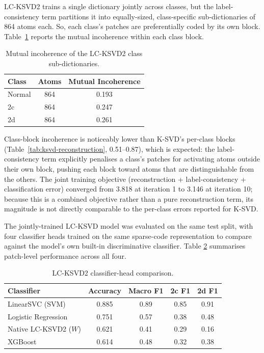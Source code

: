 LC-KSVD2 trains a single dictionary jointly across classes, but the label-consistency
term partitions it into equally-sized, class-specific sub-dictionaries of 864 atoms each. So,
each class's patches are preferentially coded by its own block. Table~\ref{tab:lcksvd2-reconstruction}
reports the mutual incoherence within each class block.

\begin{table}[H]
\centering
\caption{Mutual incoherence of the LC-KSVD2 class sub-dictionaries.}
\label{tab:lcksvd2-reconstruction}
\begin{tabular}{lcc}
\hline
\textbf{Class} & \textbf{Atoms} & \textbf{Mutual Incoherence} \\
\hline
Normal   & 864 & 0.193 \\
2c       & 864 & 0.247 \\
2d       & 864 & 0.261 \\
\hline
\end{tabular}
\end{table}

Class-block incoherence is noticeably lower than K-SVD's per-class blocks
(Table~\ref{tab:ksvd-reconstruction}, 0.51--0.87), which is expected: the label-consistency term
explicitly penalises a class's patches for activating atoms outside their own block, pushing each
block toward atoms that are distinguishable from the others. The joint training objective (reconstruction
+ label-consistency + classification error) converged from 3.818 at iteration 1 to 3.146 at
iteration 10; because this is a combined objective rather than a pure reconstruction term, its
magnitude is not directly comparable to the per-class errors reported for K-SVD.

The jointly-trained LC-KSVD model was evaluated on the same test split, with four classifier
heads trained on the same sparse-code representation to compare against the model's own built-in discriminative classifier.
Table \ref{tab:lcksvd2-classifiers} summarises patch-level performance across all four.

\begin{table}[ht]
    \centering
    \caption{LC-KSVD2 classifier-head comparison.}
    \label{tab:lcksvd2-classifiers}
    \begin{tabular}{lcccc}
        \toprule
        \textbf{Classifier} & \textbf{Accuracy} & \textbf{Macro F1} & \textbf{2c F1} & \textbf{2d F1} \\
        \midrule
        LinearSVC (SVM)              & 0.885 & 0.89 & 0.85 & 0.91 \\
        Logistic Regression          & 0.751 & 0.57 & 0.38 & 0.48 \\
        Native LC-KSVD2 ($W$)        & 0.621 & 0.41 & 0.29 & 0.16 \\
        XGBoost                      & 0.614 & 0.48 & 0.32 & 0.38 \\
        \bottomrule
    \end{tabular}
\end{table}

